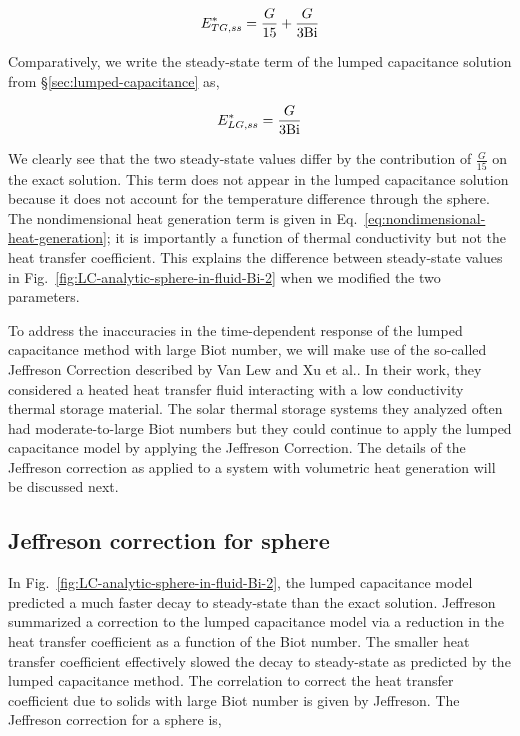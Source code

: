 \begin{equation}
	E^*_{TG,ss}=\frac{G}{15}+\frac{G}{3\mathrm{Bi}}
\end{equation}

Comparatively, we write the steady-state term of the lumped capacitance solution from \S\ref{sec:lumped-capacitance} as,

\begin{equation}
	E^*_{LG,ss} = \frac{G}{3\mathrm{Bi}}
\end{equation}

We clearly see that the two steady-state values differ by the contribution of $\frac{G}{15}$ on the exact solution. This term does not appear in the lumped capacitance solution because it does not account for the temperature difference through the sphere. The nondimensional heat generation term is given in Eq.~\ref{eq:nondimensional-heat-generation}; it is importantly a function of thermal conductivity but not the heat transfer coefficient. This explains the difference between steady-state values in Fig.~\ref{fig:LC-analytic-sphere-in-fluid-Bi-2} when we modified the two parameters.

To address the inaccuracies in the time-dependent response of the lumped capacitance method with large Biot number, we will make use of the so-called Jeffreson Correction described by Van Lew\cite{VanLew2010} and Xu et al.\cite{Xu2012}. In their work, they considered a heated heat transfer fluid interacting with a low conductivity thermal storage material. The solar thermal storage systems they analyzed often had moderate-to-large Biot numbers but they could continue to apply the lumped capacitance model by applying the Jeffreson Correction\cite{jeffreson409}. The details of the Jeffreson correction as applied to a system with volumetric heat generation will be discussed next.





\subsection{Jeffreson correction for sphere}
In Fig.~\ref{fig:LC-analytic-sphere-in-fluid-Bi-2}, the lumped capacitance model predicted a much faster decay to steady-state than the exact solution. Jeffreson summarized a correction to the lumped capacitance model via a reduction in the heat transfer coefficient as a function of the Biot number. The smaller heat transfer coefficient effectively slowed the decay to steady-state as predicted by the lumped capacitance method.
The correlation to correct the heat transfer coefficient due to solids with large Biot number is given by Jeffreson\cite{jeffreson409}. The Jeffreson correction for a sphere is,

